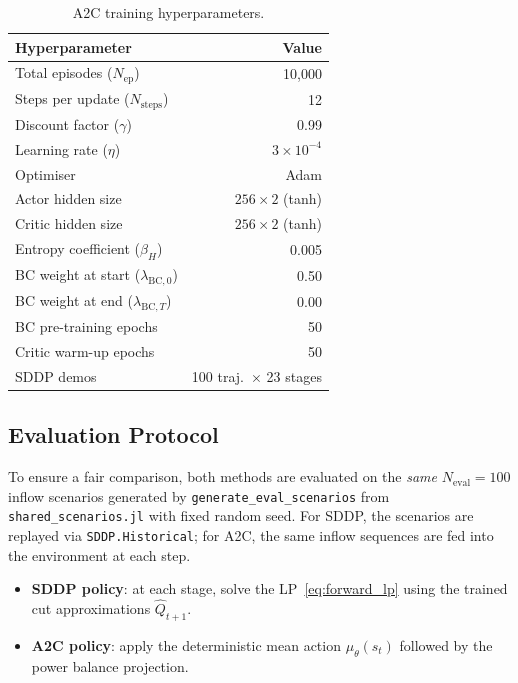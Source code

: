 \documentclass[11pt,letterpaper]{article}
\begin{document}
\begin{table}[H]
  \centering
  \caption{A2C training hyperparameters.}
  \label{tab:a2c}
  \begin{tabular}{lr}
    \toprule
    Hyperparameter & Value \\
    \midrule
    Total episodes ($N_{\mathrm{ep}}$) & 10{,}000 \\
    Steps per update ($N_{\mathrm{steps}}$) & 12 \\
    Discount factor ($\gamma$) & 0.99 \\
    Learning rate ($\eta$) & $3\times 10^{-4}$ \\
    Optimiser & Adam \\
    Actor hidden size & $256 \times 2$ (tanh) \\
    Critic hidden size & $256 \times 2$ (tanh) \\
    Entropy coefficient ($\beta_H$) & 0.005 \\
    BC weight at start ($\lambda_{\mathrm{BC},0}$) & 0.50 \\
    BC weight at end ($\lambda_{\mathrm{BC},T}$) & 0.00 \\
    BC pre-training epochs & 50 \\
    Critic warm-up epochs & 50 \\
    SDDP demos & 100 traj.\ $\times$ 23 stages \\
    \bottomrule
  \end{tabular}
\end{table}

\subsection{Evaluation Protocol}
\label{sec:eval}

To ensure a fair comparison, both methods are evaluated on the \emph{same}
$N_{\mathrm{eval}} = 100$ inflow scenarios generated by \texttt{generate\_eval\_scenarios}
from \texttt{shared\_scenarios.jl} with fixed random seed.
For SDDP, the scenarios are replayed via \texttt{SDDP.Historical}; for A2C,
the same inflow sequences are fed into the environment at each step.

\begin{itemize}[noitemsep]
  \item \textbf{SDDP policy}: at each stage, solve the LP~\eqref{eq:forward_lp}
        using the trained cut approximations $\hat{Q}_{t+1}$.
  \item \textbf{A2C policy}: apply the deterministic mean action
        $\mu_\theta(s_t)$ followed by the power balance projection.
\end{itemize}
\end{document}
